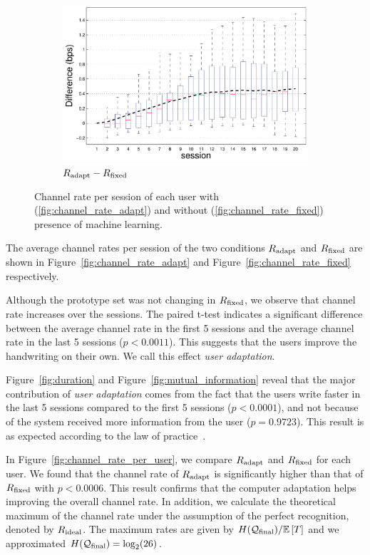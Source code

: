\documentclass{sigchi}
\begin{document}
\begin{figure}[!t]
\begin{subfigure}[b]{\columnwidth}
    \includegraphics[width=\columnwidth]{figures/IUI_BPS_diff_p_first.pdf}
    \caption{$R_{\mathrm{adapt}} - R_{\mathrm{fixed}}$}
    \label{fig:channel_rate_diff}
  \end{subfigure}
  \label{fig:channel_rate}
  \caption{Channel rate per session of each user with
    (\ref{fig:channel_rate_adapt}) and without (\ref{fig:channel_rate_fixed})
    presence of machine learning. }
\end{figure}

The average channel rates per session of the two conditions $R_{\mathrm{adapt}}$
and $R_{\mathrm{fixed}}$ are shown in Figure~\ref{fig:channel_rate_adapt} and
Figure~\ref{fig:channel_rate_fixed} respectively.

Although the prototype set was not changing in $R_{\mathrm{fixed}}$, we observe
that channel rate increases over the sessions. The paired t-test
indicates a significant difference between the average channel rate in
the first 5 sessions and the average channel rate in the last 5
sessions ($p < 0.0011$). This suggests that the users improve the
handwriting on their own. We call this effect {\em user
  adaptation}.

Figure~\ref{fig:duration} and Figure~\ref{fig:mutual_information}
reveal that the major contribution of {\em user adaptation} comes from
the fact that the users write faster in the last 5 sessions
compared to the first 5 sessions ($p < 0.0001$), and not because of the
system received more information from the user ($p = 0.9723$). This
result is as expected according to the law of practice~\cite{Newell1981}.

In Figure~\ref{fig:channel_rate_per_user}, we compare $R_{\mathrm{adapt}}$ and
$R_{\mathrm{fixed}}$ for each user. We found that the channel rate of
$R_{\mathrm{adapt}}$ is significantly higher than that of $R_{\mathrm{fixed}}$ with $p <
0.0006$.  This result confirms that the computer adaptation helps
improving the overall channel rate. In addition, we calculate the
theoretical maximum of the channel rate under the assumption of the
perfect recognition, denoted by $R_{\mathrm{ideal}}$. The maximum rates are
given by $H(\mathcal{Q}_{\mathrm{final}}) / \mathbb{E} \left[T\right]$ and we approximated $H(\mathcal{Q}_{\mathrm{final}}) =
\log_2(26)$.
\end{document}

